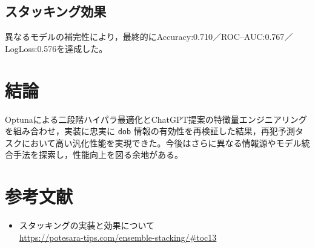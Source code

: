 \documentclass[a4paper,11pt]{article}
\begin{document}
\subsection{スタッキング効果}
異なるモデルの補完性により，最終的にAccuracy:0.710／ROC–AUC:0.767／LogLoss:0.576を達成した。

\section{結論}
Optunaによる二段階ハイパラ最適化とChatGPT提案の特徴量エンジニアリングを組み合わせ，実装に忠実に \texttt{dob} 情報の有効性を再検証した結果，再犯予測タスクにおいて高い汎化性能を実現できた。今後はさらに異なる情報源やモデル統合手法を探索し，性能向上を図る余地がある。

\section*{参考文献}
\begin{itemize}
  \item スタッキングの実装と効果について \\
  \url{https://potesara-tips.com/ensemble-stacking/#toc13}
\end{itemize}
\end{document}
